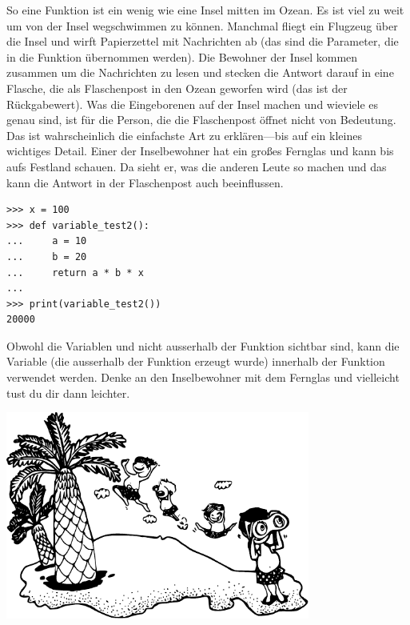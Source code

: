 So eine Funktion ist ein wenig wie eine Insel mitten im Ozean. Es ist viel zu weit um von der Insel wegschwimmen zu können. Manchmal fliegt ein Flugzeug über die Insel und wirft Papierzettel mit Nachrichten ab (das sind die Parameter, die in die Funktion übernommen werden). Die Bewohner der Insel kommen zusammen um die Nachrichten zu lesen und stecken die Antwort darauf in eine Flasche, die als Flaschenpost in den Ozean geworfen wird (das ist der Rückgabewert). Was die Eingeborenen auf der Insel machen und wieviele es genau sind, ist für die Person, die die Flaschenpost öffnet nicht von Bedeutung. Das ist wahrscheinlich die einfachste Art  zu erklären---bis auf ein kleines wichtiges Detail. Einer der Inselbewohner hat ein großes Fernglas und kann bis aufs Festland schauen. Da sieht er, was die anderen Leute so machen und das kann die Antwort in der Flaschenpost auch beeinflussen.

\begin{Verbatim}[frame=single]
>>> x = 100
>>> def variable_test2():
...     a = 10
...     b = 20
...     return a * b * x
...
>>> print(variable_test2())
20000
\end{Verbatim}

Obwohl die Variablen  und  nicht ausserhalb der Funktion sichtbar sind, kann die Variable  (die ausserhalb der Funktion erzeugt wurde) innerhalb der Funktion verwendet werden. Denke an den Inselbewohner mit dem Fernglas und vielleicht tust du dir dann leichter.

\begin{center}
\includegraphics*[width=100mm]{images/islanders}
\end{center}


